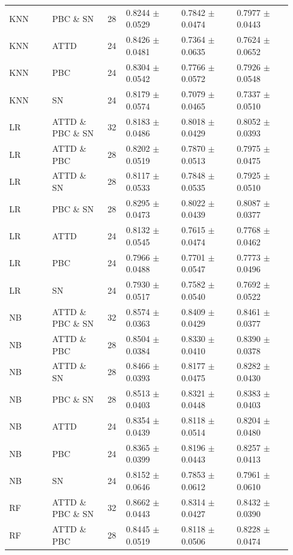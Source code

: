 \documentclass[10pt,a4paper]{article}
\newcommand{\classifiersep}{\addlinespace[1pt]\midrule\addlinespace[1pt]}
\begin{document}
\begin{landscape}
\begin{longtable}{@{}L{0.14\linewidth}L{0.18\linewidth}C{0.06\linewidth}C{0.18\linewidth}C{0.18\linewidth}C{0.18\linewidth}@{}}
KNN & PBC \& SN & 28 & 0.8244 $\pm$ 0.0529 & 0.7842 $\pm$ 0.0474 & 0.7977 $\pm$ 0.0443 \\
KNN & ATTD & 24 & 0.8426 $\pm$ 0.0481 & 0.7364 $\pm$ 0.0635 & 0.7624 $\pm$ 0.0652 \\
KNN & PBC & 24 & 0.8304 $\pm$ 0.0542 & 0.7766 $\pm$ 0.0572 & 0.7926 $\pm$ 0.0548 \\
KNN & SN & 24 & 0.8179 $\pm$ 0.0574 & 0.7079 $\pm$ 0.0465 & 0.7337 $\pm$ 0.0510 \\
\classifiersep
LR & ATTD \& PBC \& SN & 32 & 0.8183 $\pm$ 0.0486 & 0.8018 $\pm$ 0.0429 & 0.8052 $\pm$ 0.0393 \\
LR & ATTD \& PBC & 28 & 0.8202 $\pm$ 0.0519 & 0.7870 $\pm$ 0.0513 & 0.7975 $\pm$ 0.0475 \\
LR & ATTD \& SN & 28 & 0.8117 $\pm$ 0.0533 & 0.7848 $\pm$ 0.0535 & 0.7925 $\pm$ 0.0510 \\
LR & PBC \& SN & 28 & 0.8295 $\pm$ 0.0473 & 0.8022 $\pm$ 0.0439 & 0.8087 $\pm$ 0.0377 \\
LR & ATTD & 24 & 0.8132 $\pm$ 0.0545 & 0.7615 $\pm$ 0.0474 & 0.7768 $\pm$ 0.0462 \\
LR & PBC & 24 & 0.7966 $\pm$ 0.0488 & 0.7701 $\pm$ 0.0547 & 0.7773 $\pm$ 0.0496 \\
LR & SN & 24 & 0.7930 $\pm$ 0.0517 & 0.7582 $\pm$ 0.0540 & 0.7692 $\pm$ 0.0522 \\
\classifiersep
NB & ATTD \& PBC \& SN & 32 & 0.8574 $\pm$ 0.0363 & 0.8409 $\pm$ 0.0429 & 0.8461 $\pm$ 0.0377 \\
NB & ATTD \& PBC & 28 & 0.8504 $\pm$ 0.0384 & 0.8330 $\pm$ 0.0410 & 0.8390 $\pm$ 0.0378 \\
NB & ATTD \& SN & 28 & 0.8466 $\pm$ 0.0393 & 0.8177 $\pm$ 0.0475 & 0.8282 $\pm$ 0.0430 \\
NB & PBC \& SN & 28 & 0.8513 $\pm$ 0.0403 & 0.8321 $\pm$ 0.0448 & 0.8383 $\pm$ 0.0403 \\
NB & ATTD & 24 & 0.8354 $\pm$ 0.0439 & 0.8118 $\pm$ 0.0514 & 0.8204 $\pm$ 0.0480 \\
NB & PBC & 24 & 0.8365 $\pm$ 0.0399 & 0.8196 $\pm$ 0.0443 & 0.8257 $\pm$ 0.0413 \\
NB & SN & 24 & 0.8152 $\pm$ 0.0646 & 0.7853 $\pm$ 0.0612 & 0.7961 $\pm$ 0.0610 \\
\classifiersep
RF & ATTD \& PBC \& SN & 32 & 0.8662 $\pm$ 0.0443 & 0.8314 $\pm$ 0.0427 & 0.8432 $\pm$ 0.0390 \\
RF & ATTD \& PBC & 28 & 0.8445 $\pm$ 0.0519 & 0.8118 $\pm$ 0.0506 & 0.8228 $\pm$ 0.0474 \\

\end{longtable}
\end{landscape}
\end{document}
